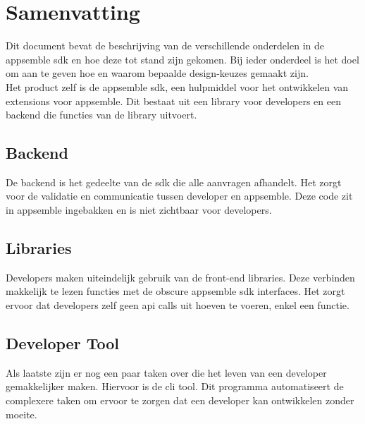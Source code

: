 \chapter{Samenvatting}
Dit document bevat de beschrijving van de verschillende onderdelen in de appsemble sdk en hoe deze tot stand zijn gekomen. Bij ieder onderdeel is het doel om aan te geven hoe en waarom bepaalde design-keuzes gemaakt zijn. \\

Het product zelf is de appsemble sdk, een hulpmiddel voor het ontwikkelen van extensions voor appsemble. Dit bestaat uit een library voor developers en een backend die functies van de library uitvoert.

\section{Backend}

De backend is het gedeelte van de sdk die alle aanvragen afhandelt. Het zorgt voor de validatie en communicatie tussen developer en appsemble. Deze code zit in appsemble ingebakken en is niet zichtbaar voor developers. 

\section{Libraries}

Developers maken uiteindelijk gebruik van de front-end libraries. Deze verbinden makkelijk te lezen functies met de obscure appsemble sdk interfaces. Het zorgt ervoor dat developers zelf geen api calls uit hoeven te voeren, enkel een functie.

\section{Developer Tool}

Als laatste zijn er nog een paar taken over die het leven van een developer gemakkelijker maken. Hiervoor is de cli tool. Dit programma automatiseert de complexere taken om ervoor te zorgen dat een developer kan ontwikkelen zonder moeite.